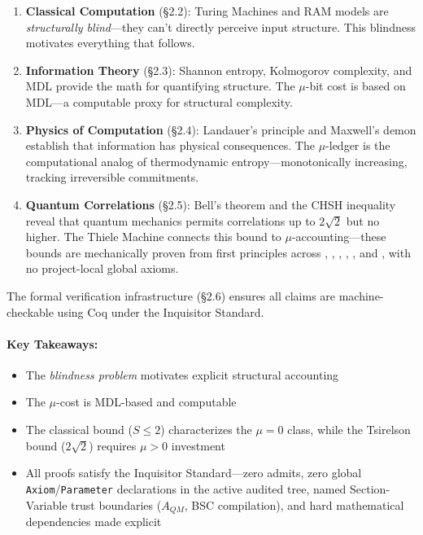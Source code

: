 \begin{enumerate}
    \item \textbf{Classical Computation} (\S2.2): Turing Machines and RAM models are \textit{structurally blind}---they can't directly perceive input structure. This blindness motivates everything that follows.

\item \textbf{Information Theory} (\S2.3): Shannon entropy, Kolmogorov complexity, and MDL provide the math for quantifying structure. The $\mu$-bit cost is based on MDL---a computable proxy for structural complexity.

\item \textbf{Physics of Computation} (\S2.4): Landauer's principle and Maxwell's demon establish that information has physical consequences. The $\mu$-ledger is the computational analog of thermodynamic entropy---monotonically increasing, tracking irreversible commitments.

\item \textbf{Quantum Correlations} (\S2.5): Bell's theorem and the CHSH inequality reveal that quantum mechanics permits correlations up to $2\sqrt{2}$ but no higher. The Thiele Machine connects this bound to $\mu$-accounting---these bounds are mechanically proven from first principles across , , , , , and , with no project-local global axioms.
\end{enumerate}

\noindent
The formal verification infrastructure (\S2.6) ensures all claims are machine-checkable using Coq under the Inquisitor Standard.

\paragraph{Key Takeaways:}
\begin{itemize}
    \item The \textit{blindness problem} motivates explicit structural accounting
    \item The $\mu$-cost is MDL-based and computable
    \item The classical bound ($S \le 2$) characterizes the $\mu=0$ class, while the Tsirelson bound ($2\sqrt{2}$) requires $\mu > 0$ investment
    \item All proofs satisfy the Inquisitor Standard---zero admits, zero global \texttt{Axiom}/\texttt{Parameter} declarations in the active audited tree, named Section-Variable trust boundaries ($A_{QM}$, BSC compilation), and hard mathematical dependencies made explicit
\end{itemize}
